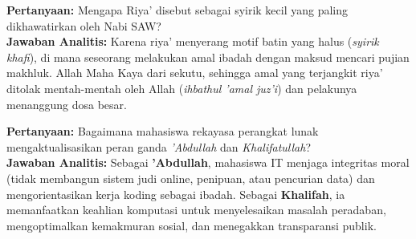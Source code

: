 \documentclass[10pt,a4paper]{article}
\begin{document}
\begin{soalbox}
\textbf{Pertanyaan:} Mengapa Riya' disebut sebagai syirik kecil yang paling dikhawatirkan oleh Nabi SAW? \\
\textbf{Jawaban Analitis:} Karena riya' menyerang motif batin yang halus (\textit{syirik khafi}), di mana seseorang melakukan amal ibadah dengan maksud mencari pujian makhluk. Allah Maha Kaya dari sekutu, sehingga amal yang terjangkit riya' ditolak mentah-mentah oleh Allah (\textit{ihbathul 'amal juz'i}) dan pelakunya menanggung dosa besar.
\end{soalbox}

\begin{soalbox}
\textbf{Pertanyaan:} Bagaimana mahasiswa rekayasa perangkat lunak mengaktualisasikan peran ganda \textit{'Abdullah} dan \textit{Khalifatullah}? \\
\textbf{Jawaban Analitis:} Sebagai \textbf{'Abdullah}, mahasiswa IT menjaga integritas moral (tidak membangun sistem judi online, penipuan, atau pencurian data) dan mengorientasikan kerja koding sebagai ibadah. Sebagai \textbf{Khalifah}, ia memanfaatkan keahlian komputasi untuk menyelesaikan masalah peradaban, mengoptimalkan kemakmuran sosial, dan menegakkan transparansi publik.
\end{soalbox}
\end{document}
